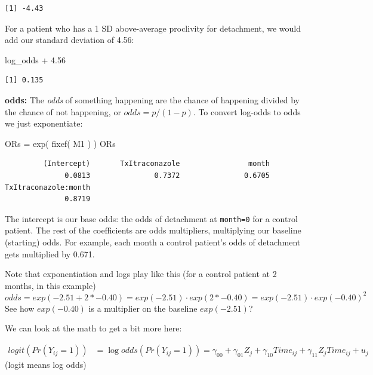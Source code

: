 \documentclass[
  letterpaper,
  DIV=11,
  numbers=noendperiod]{scrreprt}
\newenvironment{Shaded}{}{}
\newcommand{\FloatTok}[1]{\textcolor[rgb]{0.25,0.63,0.44}{#1}}
\newcommand{\FunctionTok}[1]{\textcolor[rgb]{0.02,0.16,0.49}{#1}}
\newcommand{\NormalTok}[1]{#1}
\newcommand{\OtherTok}[1]{\textcolor[rgb]{0.00,0.44,0.13}{#1}}
\newcommand{\SpecialCharTok}[1]{\textcolor[rgb]{0.25,0.44,0.63}{#1}}
\begin{document}
\begin{verbatim}
[1] -4.43
\end{verbatim}

For a patient who has a 1 SD above-average proclivity for detachment, we
would add our standard deviation of 4.56:

\begin{Shaded}
\begin{Highlighting}[]
\NormalTok{log\_odds }\SpecialCharTok{+} \FloatTok{4.56}
\end{Highlighting}
\end{Shaded}

\begin{verbatim}
[1] 0.135
\end{verbatim}

\textbf{odds:} The \emph{odds} of something happening are the chance of
happening divided by the chance of not happening, or \(odds = p/(1-p)\).
To convert log-odds to odds we just exponentiate:

\begin{Shaded}
\begin{Highlighting}[]
\NormalTok{ORs }\OtherTok{=} \FunctionTok{exp}\NormalTok{( }\FunctionTok{fixef}\NormalTok{( M1 ) )}
\NormalTok{ORs}
\end{Highlighting}
\end{Shaded}

\begin{verbatim}
         (Intercept)       TxItraconazole                month 
              0.0813               0.7372               0.6705 
TxItraconazole:month 
              0.8719 
\end{verbatim}

The intercept is our base odds: the odds of detachment at
\texttt{month=0} for a control patient. The rest of the coefficients are
odds multipliers, multiplying our baseline (starting) odds. For example,
each month a control patient's odds of detachment gets multiplied by
0.671.

Note that exponentiation and logs play like this (for a control patient
at 2 months, in this example)
\[ odds = exp( -2.51 + 2 * -0.40 ) = exp( -2.51 ) \cdot exp( 2 * -0.40 ) = exp( -2.51 ) \cdot exp( -0.40 )^2 \]
See how \(exp( -0.40 )\) is a multiplier on the baseline
\(exp( -2.51 )\)?

We can look at the math to get a bit more here:

\[
\begin{aligned}
logit( Pr( Y_{ij} = 1 ) ) &= \log odds( Pr( Y_{ij} = 1 ) ) = \gamma_{00} + \gamma_{01} Z_j + \gamma_{10} Time_{ij} + \gamma_{11} Z_j Time_{ij} + u_j
\end{aligned}
\] (logit means log odds)
\end{document}
